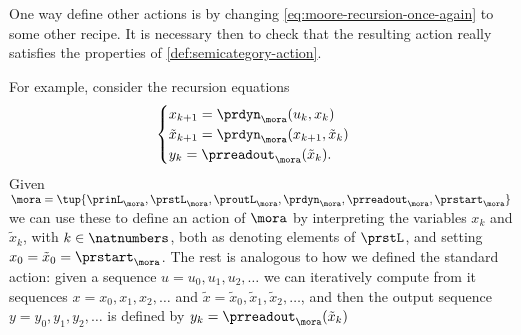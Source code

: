 One way define other actions is by changing \cref{eq:moore-recursion-once-again} to some other recipe. It is necessary then to check that the resulting action really satisfies the properties of \cref{def:semicategory-action}. 

For example, consider the recursion equations
\begin{equation}
\label{eq:moore-new-recursion-equations}
    \begin{cases}
        x_{k+1} = \prdyn_\mora(u_k, x_k) \\
        \tilde x_{k+1} = \prdyn_\mora(x_{k+1}, \tilde x_k) \\
        y_{k}   = \prreadout_\mora(\tilde x_{k}).
    \end{cases}
\end{equation}
Given  $\mora = \tup{\prinL_\mora,\prstL_\mora,\proutL_\mora,\prdyn_\mora,\prreadout_\mora,\prstart_\mora}$ we can use these to define an action of $\mora$ by interpreting the variables $x_k$ and $\tilde x_k$, with $k \in \natnumbers$, both as denoting elements of $\prstL$, and setting $x_0 = \tilde x_0 = \prstart_\mora$. The rest is analogous to how we defined the standard action: given a sequence $u = u_0, u_1, u_2, \dots$ we can iteratively compute from it sequences $x = x_0, x_1, x_2, \dots $ and $\tilde x = \tilde x_0, \tilde x_1, \tilde x_2, \dots$, and then the output sequence $y = y_0, y_1, y_2, \dots $ is defined by $y_{k}   = \prreadout_\mora(\tilde x_{k})$






\

\

\


